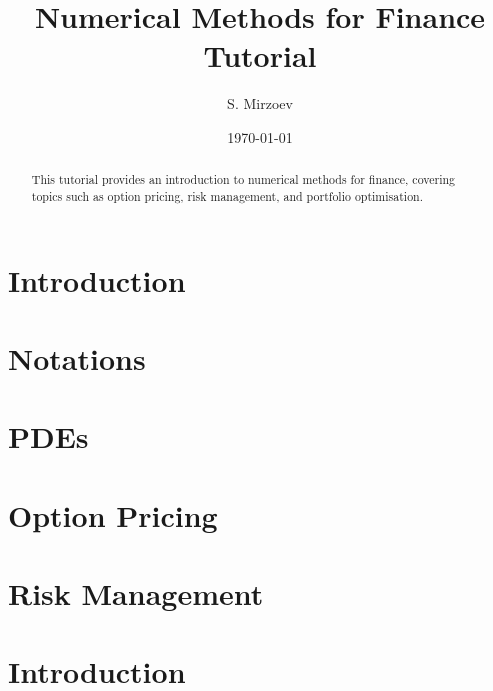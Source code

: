 \documentclass{article}
\title{Numerical Methods for Finance Tutorial}
\author{S. Mirzoev}
\date{\today}
\begin{document}
\maketitle

\begin{abstract}
This tutorial provides an introduction to numerical methods for finance, covering topics such as option pricing, risk management, and portfolio optimisation.
\end{abstract}

\section{Introduction}


\section{Notations}


\section{PDEs}


\section{Option Pricing}
% 

\section{Risk Management}
% 


\section{Introduction}
\end{document}
